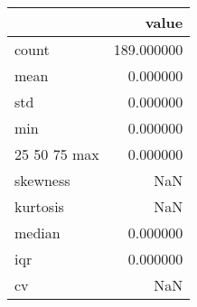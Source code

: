\begin{tabular}{lr}
\toprule
 & value \\
\midrule
count & 189.000000 \\
mean & 0.000000 \\
std & 0.000000 \\
min & 0.000000 \\
25%
50%
75%
max & 0.000000 \\
skewness & NaN \\
kurtosis & NaN \\
median & 0.000000 \\
iqr & 0.000000 \\
cv & NaN \\
\bottomrule
\end{tabular}
